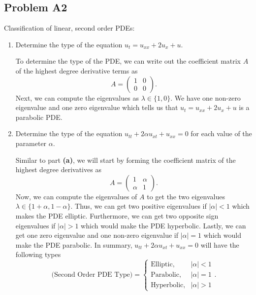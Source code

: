 \documentclass[a4paper,12pt]{article}
\newcommand{\abs}[1]{\left| #1 \right|}
\newcommand{\pmat}[1]{\begin{pmatrix} #1 \end{pmatrix}}
\begin{document}
\subsection*{Problem A2}
    Classification of linear, second order PDEs:
     \begin{enumerate}[label = \textbf{(\alph*)}]
            \item Determine the type of the equation $ u_t = u_{xx} + 2 u_x + u $.
            
            To determine the type of the PDE, we can write out the coefficient matrix $ A $ of the highest degree derivative terms as 
            \[
                A =
                \pmat{
                    1 & 0 \\
                    0 & 0
                }.
            \]
            Next, we can compute the eigenvalues as $ \lambda \in \{1, 0\} $. We have one non-zero eigenvalue and one zero eigenvalue which tells us that $ u_t = u_{xx} + 2 u_x + u $ is a parabolic PDE.
            
            \item Determine the type of the equation $ u_{tt} + 2 \alpha u_{xt} + u_{xx} = 0 $ for each value of the parameter $ \alpha $.
            
            Similar to part \textbf{(a)}, we will start by forming the coefficient matrix of the highest degree derivatives as
            \[
                A =
                \pmat{
                    1 & \alpha \\
                    \alpha & 1
                }.
            \]
            Now, we can compute the eigenvalues of $ A $ to get the two eigenvalues $ \lambda \in \{1 + \alpha, 1 - \alpha\} $. Thus, we can get two positive eigenvalues if $ \abs{\alpha} < 1 $ which makes the PDE elliptic. Furthermore, we can get two opposite sign eigenvalues if $ \abs{\alpha} > 1 $ which would make the PDE hyperbolic. Lastly, we can get one zero eigenvalue and one non-zero eigenvalue if $ \abs{\alpha} = 1 $ which would make the PDE parabolic. In summary, $ u_{tt} + 2 \alpha u_{xt} + u_{xx} = 0 $ will have the following types
            \[
                \text{(Second Order PDE Type)} =
                \begin{cases}
                    \text{Elliptic}, & \abs{\alpha} < 1 \\
                    \text{Parabolic}, & \abs{\alpha} = 1 \\
                    \text{Hyperbolic}, & \abs{\alpha} > 1
                \end{cases}.
           \] 
            

\end{enumerate}
\end{document}
